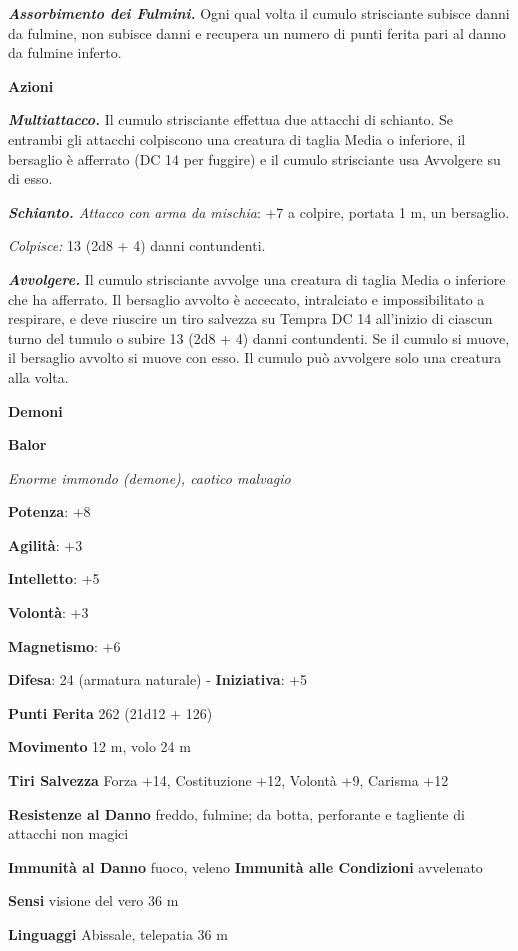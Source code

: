 \begin{multicols}{2}
\emph{\textbf{Assorbimento dei Fulmini.}} Ogni qual volta il cumulo
strisciante subisce danni da fulmine, non subisce danni e recupera un
numero di punti ferita pari al danno da fulmine inferto.

\smallskip\textbf{Azioni}

\emph{\textbf{Multiattacco.}} Il cumulo strisciante effettua due
attacchi di schianto. Se entrambi gli attacchi colpiscono una creatura
di taglia Media o inferiore, il bersaglio è afferrato (DC 14 per
fuggire) e il cumulo strisciante usa Avvolgere su di esso.

\emph{\textbf{Schianto.} Attacco con arma da mischia}: +7 a colpire,
portata 1 m, un bersaglio.

\emph{Colpisce:} 13 (2d8 + 4) danni contundenti.

\emph{\textbf{Avvolgere.}} Il cumulo strisciante avvolge una creatura di
taglia Media o inferiore che ha afferrato. Il bersaglio avvolto è
accecato, intralciato e impossibilitato a respirare, e deve riuscire un
tiro salvezza su Tempra DC 14 all'inizio di ciascun turno del
tumulo o subire 13 (2d8 + 4) danni contundenti. Se il cumulo si muove,
il bersaglio avvolto si muove con esso. Il cumulo può avvolgere solo una
creatura alla volta.

\textbf{Demoni}

\textbf{Balor}

\emph{Enorme immondo (demone), caotico malvagio}

\textbf{Potenza}: +8

\textbf{Agilità}: +3

\textbf{Intelletto}: +5

\textbf{Volontà}: +3

\textbf{Magnetismo}: +6

\textbf{Difesa}: 24 (armatura naturale) - \textbf{Iniziativa}: +5

\textbf{Punti Ferita} 262 (21d12 + 126)

\textbf{Movimento} 12 m, volo 24 m

\textbf{Tiri Salvezza} Forza +14, Costituzione +12, Volontà +9, Carisma +12

\textbf{Resistenze al Danno} freddo, fulmine; da botta, perforante e tagliente di attacchi non magici

\textbf{Immunità al Danno} fuoco, veleno \textbf{Immunità alle
Condizioni} avvelenato

\textbf{Sensi} visione del vero 36 m

\textbf{Linguaggi} Abissale, telepatia 36 m


\end{multicols}
